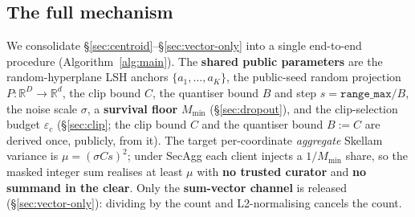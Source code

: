 \documentclass[pdflatex,sn-mathphys-num,iicol]{sn-jnl}
\theoremstyle{thmstyleone}%
\theoremstyle{thmstyletwo}%
\theoremstyle{thmstylethree}%
\newcommand{\eps}{\varepsilon}
\newcommand{\R}{\mathbb{R}}
\newcommand{\secref}[1]{\S\ref{#1}}
\begin{document}
\subsection{The full mechanism}\label{sec:algorithm}

We consolidate \secref{sec:centroid}--\secref{sec:vector-only} into a single
end-to-end procedure (Algorithm~\ref{alg:main}). The \textbf{shared public parameters}
are the random-hyperplane LSH anchors $\{a_1, \dots, a_K\}$, the public-seed random
projection $P : \R^{D} \to \R^{d}$, the clip bound $C$, the quantiser bound $B$ and
step $s = \texttt{range\_max}/B$, the noise scale $\sigma$, a \textbf{survival floor}
$M_{\min}$ (\secref{sec:dropout}), and the clip-selection budget $\eps_c$
(\secref{sec:clip}; the clip bound $C$ and the quantiser bound $B := C$ are derived
once, publicly, from it). The target per-coordinate \emph{aggregate} Skellam variance
is $\mu = (\sigma C s)^2$; under SecAgg each client injects a $1/M_{\min}$ share, so
the masked integer sum realises at least $\mu$ with \textbf{no trusted curator} and
\textbf{no summand in the clear}. Only the \textbf{sum-vector channel} is released
(\secref{sec:vector-only}): dividing by the count and L2-normalising cancels the count.
\end{document}
